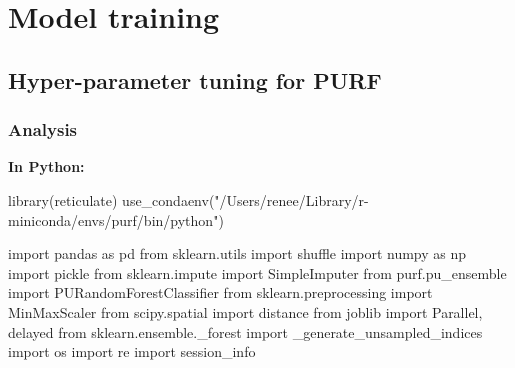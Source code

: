 \documentclass[
  11pt,
  oneside]{book}
\newenvironment{Shaded}{\begin{snugshade}}{\end{snugshade}}
\newcommand{\FunctionTok}[1]{\textcolor[rgb]{0.00,0.00,0.00}{#1}}
\newcommand{\ImportTok}[1]{#1}
\newcommand{\NormalTok}[1]{#1}
\newcommand{\StringTok}[1]{\textcolor[rgb]{0.31,0.60,0.02}{#1}}
\begin{document}
\hypertarget{02_model_training}{%
\chapter{Model training}\label{02_model_training}}

\hypertarget{hyper-parameter-tuning-for-purf}{%
\section{Hyper-parameter tuning for PURF}\label{hyper-parameter-tuning-for-purf}}

\hypertarget{analysis}{%
\subsection{Analysis}\label{analysis}}

\textbf{In Python: }

\begin{Shaded}
\begin{Highlighting}[]
\FunctionTok{library}\NormalTok{(reticulate)}
\FunctionTok{use\_condaenv}\NormalTok{(}\StringTok{"/Users/renee/Library/r{-}miniconda/envs/purf/bin/python"}\NormalTok{)}
\end{Highlighting}
\end{Shaded}

\begin{Shaded}
\begin{Highlighting}[]
\ImportTok{import}\NormalTok{ pandas }\ImportTok{as}\NormalTok{ pd}
\ImportTok{from}\NormalTok{ sklearn.utils }\ImportTok{import}\NormalTok{ shuffle}
\ImportTok{import}\NormalTok{ numpy }\ImportTok{as}\NormalTok{ np}
\ImportTok{import}\NormalTok{ pickle}
\ImportTok{from}\NormalTok{ sklearn.impute }\ImportTok{import}\NormalTok{ SimpleImputer}
\ImportTok{from}\NormalTok{ purf.pu\_ensemble }\ImportTok{import}\NormalTok{ PURandomForestClassifier}
\ImportTok{from}\NormalTok{ sklearn.preprocessing }\ImportTok{import}\NormalTok{ MinMaxScaler}
\ImportTok{from}\NormalTok{ scipy.spatial }\ImportTok{import}\NormalTok{ distance}
\ImportTok{from}\NormalTok{ joblib }\ImportTok{import}\NormalTok{ Parallel, delayed}
\ImportTok{from}\NormalTok{ sklearn.ensemble.\_forest }\ImportTok{import}\NormalTok{ \_generate\_unsampled\_indices}
\ImportTok{import}\NormalTok{ os}
\ImportTok{import}\NormalTok{ re}
\ImportTok{import}\NormalTok{ session\_info}
\end{Highlighting}
\end{Shaded}
\end{document}
